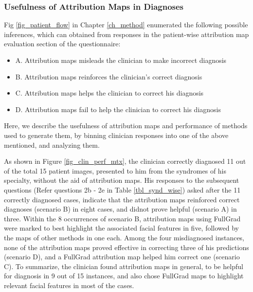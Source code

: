 \documentclass[../report.tex]{subfiles}
\begin{document}
  \subsubsection{Usefulness of Attribution Maps in Diagnoses}
  Fig \ref{fig_patient_flow} in Chapter \ref{ch_method} enumerated the following possible inferences, which can obtained from responses in the patient-wise attribution map evaluation section of the questionnaire:
  \begin{itemize}
  	\item A. Attribution maps misleads the clinician to make incorrect diagnosis
  	\item B. Attribution maps reinforces the clinician's correct diagnosis
  	\item C. Attribution maps helps the clinician to correct his diagnosis
  	\item D. Attribution maps fail to help the clinician to correct his diagnosis
  \end{itemize} 
  Here, we describe the usefulness of attribution maps and performance of methods used to generate them, by binning clinician responses into one of the above mentioned, and analyzing them. 
  
  As shown in Figure \ref{fig_clin_perf_mtx}, the clinician correctly diagnosed 11 out of the total 15 patient images, presented to him from the syndromes of his specialty, without the aid of attribution maps. His responses to the subsequent questions (Refer questions 2b - 2e in Table \ref{tbl_synd_wise}) asked after the 11 correctly diagnosed cases, indicate that the attribution maps reinforced correct diagnoses (scenario B) in eight cases, and didnot prove helpful (scenario A) in  three. Within the 8 occurrences of scenario B, attribution maps using FullGrad were marked to best highlight the associated facial features in five, followed by the maps of other methods in one each. Among the four misdiagnosed instances, none of the attribution maps proved effective in correcting three of his predictions (scenario D), and a FullGrad attribution map helped him correct one (scenario C). To summarize, the clinician found attribution maps in general, to be helpful for diagnosis in 9 out of 15 instances, and also chose FullGrad maps to highlight relevant facial features in most of the cases.
\end{document}

